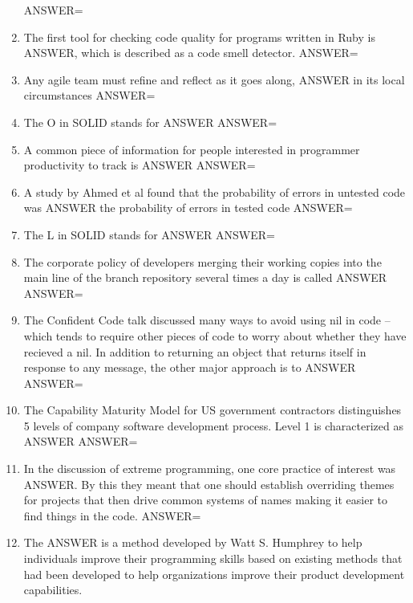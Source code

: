 \documentclass{exam}
\begin{document}
\begin{enumerate}
ANSWER=
\item The first tool for checking code quality for programs written in Ruby is ANSWER, which is described as a code smell detector.\newline
ANSWER=
\item Any agile team must refine and reflect as it goes along, ANSWER in its local circumstances\newline
ANSWER=
\item The O in SOLID stands for ANSWER\newline
ANSWER=
\item A common piece of information for people interested in programmer productivity to track is ANSWER\newline
ANSWER=
\item A study by Ahmed et al found that the probability of errors in untested code was ANSWER the probability of errors in tested code\newline
ANSWER=
\item The L in SOLID stands for ANSWER\newline
ANSWER=
\item The corporate policy of developers merging their working copies into the main line of the branch repository several times a day is called ANSWER\newline
ANSWER=
\item The Confident Code talk discussed many ways to avoid using nil in code -- which tends to require other pieces of code to worry about whether they have recieved a nil.  In addition to returning an object that returns itself in response to any message, the other major approach is to ANSWER\newline
ANSWER=
\item The Capability Maturity Model for US government contractors distinguishes 5 levels of company software development process.  Level 1 is characterized as ANSWER\newline
ANSWER=
\item In the discussion of extreme programming, one core practice of interest was ANSWER.  By this they meant that one should establish overriding themes for projects that then drive common systems of names making it easier to find things in the code.\newline
ANSWER=
\item The ANSWER is a method developed by Watt S. Humphrey to help individuals improve their programming skills based on existing methods that had been developed to help organizations improve their product development capabilities.\newline

\end{enumerate}
\end{document}
